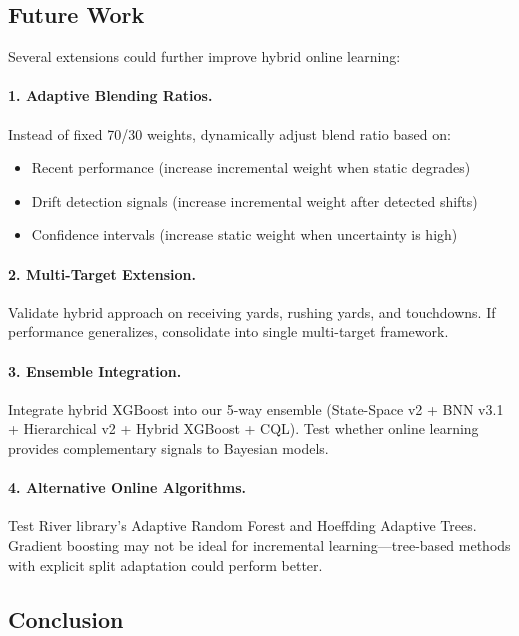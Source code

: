 \subsection{Future Work}

Several extensions could further improve hybrid online learning:

\paragraph{1. Adaptive Blending Ratios.} Instead of fixed 70/30 weights, dynamically adjust blend ratio based on:
\begin{itemize}
\item Recent performance (increase incremental weight when static degrades)
\item Drift detection signals (increase incremental weight after detected shifts)
\item Confidence intervals (increase static weight when uncertainty is high)
\end{itemize}

\paragraph{2. Multi-Target Extension.} Validate hybrid approach on receiving yards, rushing yards, and touchdowns. If performance generalizes, consolidate into single multi-target framework.

\paragraph{3. Ensemble Integration.} Integrate hybrid XGBoost into our 5-way ensemble (State-Space v2 + BNN v3.1 + Hierarchical v2 + Hybrid XGBoost + CQL). Test whether online learning provides complementary signals to Bayesian models.

\paragraph{4. Alternative Online Algorithms.} Test River library's Adaptive Random Forest and Hoeffding Adaptive Trees. Gradient boosting may not be ideal for incremental learning—tree-based methods with explicit split adaptation could perform better.

\subsection{Conclusion}

